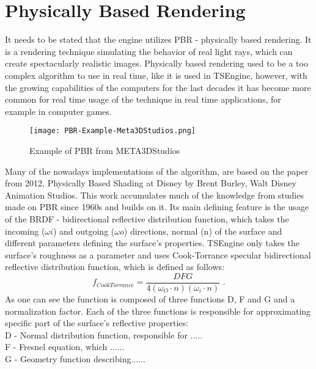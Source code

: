 \newpage
\section{Physically Based Rendering}
It needs to be stated that the engine utilizes PBR - physically based rendering. It is a rendering technique simulating the behavior of real light rays, which can create spectacularly realistic images. Physically based rendering used to be a too complex algorithm to use in real time, like it is used in TSEngine, however, with the growing capabilities of the computers for the last decades it has become more common for real time usage of the technique in real time applications, for example in computer games.

\begin{figure}
    \texttt{[image: PBR-Example-Meta3DStudios.png]}
    \caption{Example of PBR from META3DStudios}
\end{figure}

Many of the nowadays implementations of the algorithm, are based on the paper from 2012, Physically Based Shading at Disney by Brent Burley, Walt Disney Animation Studios. This work accumulates much of the knowledge from studies made on PBR since 1960s and builds on it. Its main defining feature is the usage of the BRDF - bidirectional reflective distribution function, which takes the incoming ($\omega i$) and outgoing ($\omega o$) directions, normal (n) of the surface and different parameters defining the surface's properties. TSEngine only takes the surface's roughness as a parameter and uses Cook-Torrance specular bidirectional reflective distribution function, which is defined as follows:
\begin{equation}
f_{CookTorrance}=\frac{DFG}{4(\omega_{O} \cdot n)(\omega_{i} \cdot n)}
\text{ .}
\label{EquationCookTorrance}
\end{equation}
As one can see the function is composed of three functions D, F and G and a normalization factor. Each of the three functions is responsible for approximating specific part of the surface's reflective properties:\\
D - Normal distribution function, responsible for ..... \\
F - Fresnel equation, which ......\\
G - Geometry function describing......

